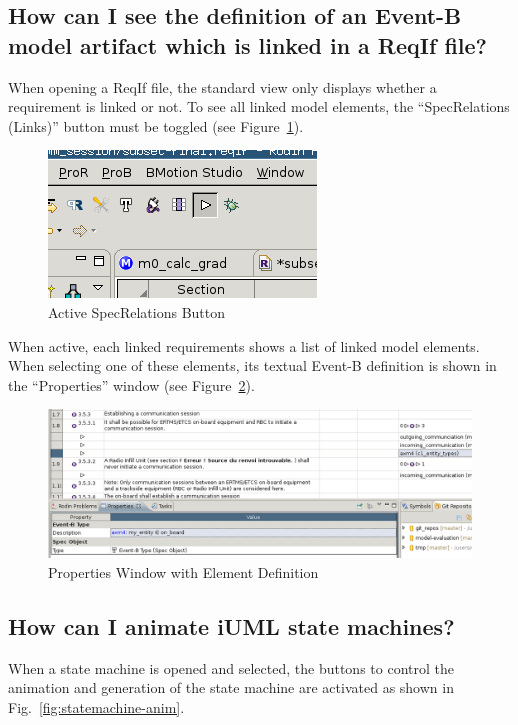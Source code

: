 \documentclass[10pt,a4paper]{article}
\begin{document}
\subsection{How can I see the definition of an Event-B model artifact which is
  linked in a ReqIf file?}
\label{sec:how-can-i}


When opening a ReqIf file, the standard view only displays whether a
requirement is linked or not. To see all linked model elements, the
``SpecRelations (Links)'' button must be toggled (see
Figure~\ref{fig:spec-relations-button}).

\begin{figure}[H]
  \centering
  \includegraphics[width=.35\textwidth]{ProR-Link-Toggle}
  \caption{Active SpecRelations Button}
  \label{fig:spec-relations-button}
\end{figure}

When active, each linked requirements shows a list of linked model
elements. When selecting one of these elements, its textual Event-B definition
is shown in the ``Properties'' window (see
Figure~\ref{fig:properties-window-element}).

\begin{figure}[H]
  \centering
  \includegraphics[width=\textwidth]{ProR-Link-View}
  \caption{Properties Window with Element Definition}
  \label{fig:properties-window-element}
\end{figure}


\subsection{How can I animate iUML state machines?}
\label{sec:how-can-i-1}

When a state machine is opened and selected, the buttons to control the
animation and generation of the state machine are activated as shown in
Fig.~\ref{fig:statemachine-anim}. 
\end{document}
